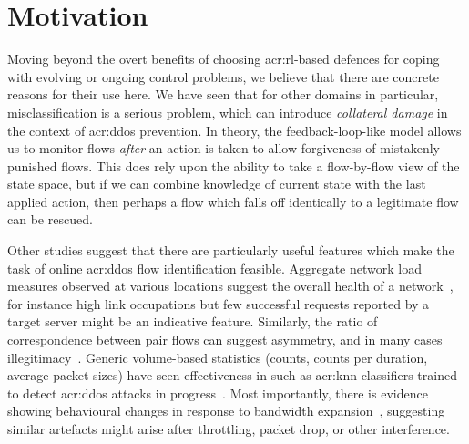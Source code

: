 \section{Motivation}\label{sec:ddos-motivation}
Moving beyond the overt benefits of choosing \gls{acr:rl}-based defences for coping with evolving or ongoing control problems, we believe that there are concrete reasons for their use here.
We have seen that for other domains in particular, misclassification is a serious problem, which can introduce \emph{collateral damage} in the context of \gls{acr:ddos} prevention.
In theory, the feedback-loop-like model allows us to monitor flows \emph{after} an action is taken to allow forgiveness of mistakenly punished flows.
This does rely upon the ability to take a flow-by-flow view of the state space, but if we can combine knowledge of current state with the last applied action, then perhaps a flow which falls off identically to a legitimate flow can be rescued.

Other studies suggest that there are particularly useful features which make the task of online \gls{acr:ddos} flow identification feasible.
Aggregate network load measures observed at various locations suggest the overall health of a network~\parencite{DBLP:journals/eaai/MalialisK15}, for instance high link occupations but few successful requests reported by a target server might be an indicative feature.
Similarly, the ratio of correspondence between pair flows can suggest asymmetry, and in many cases illegitimacy~\parencite{DBLP:conf/ndss/Rossow14}.
Generic volume-based statistics (counts, counts per duration, average packet sizes) have seen effectiveness in such as \gls{acr:knn} classifiers trained to detect \gls{acr:ddos} attacks in progress~\parencite{DBLP:conf/dsn/LeeKSPY17}.
Most importantly, there is evidence showing behavioural changes in response to bandwidth expansion~\parencite{DBLP:conf/ndss/KangGS16}, suggesting similar artefacts might arise after throttling, packet drop, or other interference.

